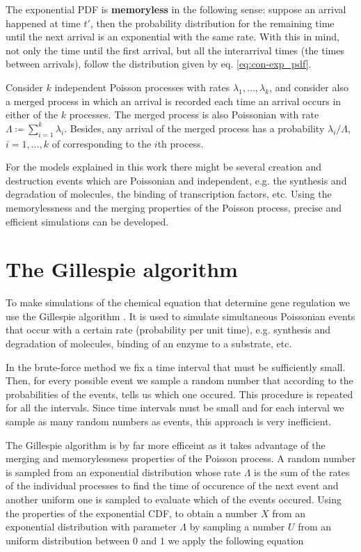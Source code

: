 The exponential PDF is \textbf{memoryless} in the following sense: suppose an arrival happened at time $t'$, then the probability distribution for the remaining time until the next arrival is an exponential with the same rate. With this in mind, not only the time until the first arrival, but all the interarrival times (the times between arrivals), follow the distribution given by eq. \eqref{eq:con-exp_pdf}.

Consider $k$ independent Poisson processes with rates $\lambda_1,\dotsc,\lambda_k$, and consider also a merged process in which an arrival is recorded each time an arrival occurs in either of the $k$ processes. The merged process is also Poissonian with rate $\Lambda\coloneqq\sum_{i=1}^k\lambda_i$. Besides, any arrival of the merged process has a probability $\lambda_i/\Lambda$, $i=1,\dotsc,k$ of corresponding to the $i$th process.

For the models explained in this work there might be several creation and destruction events which are Poissonian and independent, e.g. the synthesis and degradation of molecules, the binding of transcription factors, etc. Using the memorylessness and the merging properties of the Poisson process, precise and efficient simulations can be developed.

\section{The Gillespie algorithm}

To make simulations of the chemical equation that determine gene regulation we use the Gillespie algorithm \cite{gillespie77}. It is used to simulate simultaneous Poissonian events that occur with a certain rate (probability per unit time), e.g. synthesis and degradation of molecules, binding of an enzyme to a substrate, etc.

In the brute-force method we fix a time interval that must be sufficiently small. Then, for every possible event we sample a random number that according to the probabilities of the events, tells us which one occured. This procedure is repeated for all the intervals. Since time intervals must be small and for each interval we sample as many random numbers as events, this approach is very inefficient.

The Gillespie algorithm is by far more efficeint as it takes advantage of the merging and memorylessness properties of the Poisson process. A random number is sampled from an exponential distribution whose rate $\Lambda$ is the sum of the rates of the individual processes to find the time of occurence of the next event and another uniform one is sampled to evaluate which of the events occured. Using the properties of the exponential CDF, to obtain a number $X$ from an exponential distribution with parameter $\Lambda$ by sampling a number $U$ from an uniform distribution between $0$ and $1$ we apply the following equation


